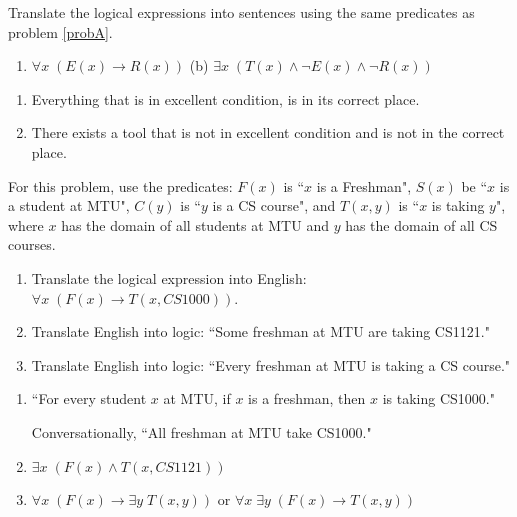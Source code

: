 \documentclass[10pt,addpoints]{exam}
\newcommand{\ra}{\rightarrow}
\begin{document}
\begin{questions}
\question[4] Translate the logical expressions into sentences using the same predicates as problem \ref{probA}.
\begin{enumerate}[label=(\alph*),itemsep=0pt,parsep=0pt,
	topsep=0pt,partopsep=0pt]
    \item $\forall x\; (E(x) \ra R(x))$ \hfill (b) $\exists x\; (T(x) \wedge \neg E(x) \wedge \neg R(x))$ \hfill
\end{enumerate}
	\ifprintanswers
        \vspace{-12pt}
    \fi
	\begin{solution}
	\begin{enumerate}[label=(\alph*),itemsep=0pt,parsep=0pt,
	topsep=0pt,partopsep=0pt]
    	\item Everything that is in excellent condition, is in its correct place.
    	\item There exists a tool that is not in excellent condition and is not in the correct place.
    \end{enumerate}
	\end{solution}



\question[6]\label{proba} For this problem, use the predicates: $F(x)$ is ``$x$ is a Freshman", $S(x)$ be ``$x$ is a student at MTU", $C(y)$ is ``$y$ is a CS course", and $T(x,y)$ is ``$x$ is taking $y$", where $x$ has the domain of all students at MTU and $y$ has the domain of all CS courses.
\begin{enumerate}[label=(\alph*),itemsep=0pt,parsep=0pt,
	topsep=0pt,partopsep=0pt]
    \item Translate the logical expression into English: $\forall x\; (F(x) \ra T(x,CS1000))$.
    \item Translate English into logic: ``Some freshman at MTU are taking CS1121."
    \item Translate English into logic: ``Every freshman at MTU is taking a CS course."
\end{enumerate}
    \ifprintanswers
        \vspace{-12pt}
    \fi
\begin{solution}
    \begin{enumerate}[label=(\alph*),itemsep=0pt,parsep=0pt,
    	topsep=0pt,partopsep=0pt]
        \item ``For every student $x$ at MTU, if $x$ is a freshman, then $x$ is taking CS1000."

            Conversationally, ``All freshman at MTU take CS1000."
        \item $\exists x\; (F(x) \wedge T(x,CS 1121))$
        \item $\forall x\; (F(x) \ra \exists y\; T(x,y))$ or $\forall x\; \exists y\; (F(x) \ra T(x,y))$
    \end{enumerate}
\end{solution}



\end{questions}
\end{document}
